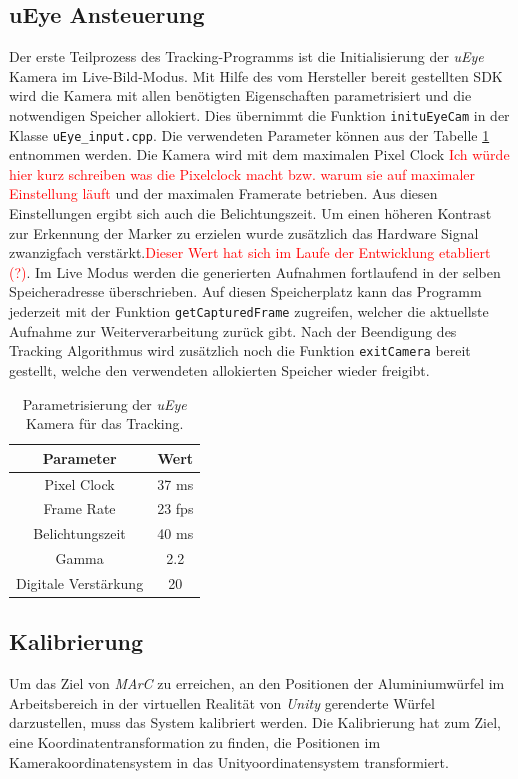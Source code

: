 \subsection{uEye Ansteuerung}
Der erste Teilprozess des Tracking-Programms ist die Initialisierung der \textit{uEye} Kamera im Live-Bild-Modus. Mit Hilfe des vom Hersteller bereit gestellten SDK wird die Kamera mit allen benötigten Eigenschaften parametrisiert und die notwendigen Speicher allokiert. Dies übernimmt die Funktion \texttt{inituEyeCam} in der Klasse \texttt{uEye\_input.cpp}. Die verwendeten Parameter können aus der Tabelle \ref{tab:UeyeParam} entnommen werden. Die Kamera wird mit dem maximalen Pixel Clock \textcolor{red}{Ich würde hier kurz schreiben was die Pixelclock macht bzw. warum sie auf maximaler Einstellung läuft} und der maximalen Framerate betrieben. Aus diesen Einstellungen ergibt sich auch die Belichtungszeit. Um einen höheren Kontrast zur Erkennung der Marker zu erzielen wurde zusätzlich das Hardware Signal zwanzigfach verstärkt.\textcolor{red}{Dieser Wert hat sich im Laufe der Entwicklung etabliert (?)}.
Im Live Modus werden die generierten Aufnahmen fortlaufend in der selben Speicheradresse überschrieben. Auf diesen Speicherplatz kann das Programm jederzeit mit der Funktion \texttt{getCapturedFrame} zugreifen, welcher die aktuellste Aufnahme zur Weiterverarbeitung zurück gibt. Nach der Beendigung des Tracking Algorithmus wird zusätzlich noch die Funktion \texttt{exitCamera} bereit gestellt, welche den verwendeten allokierten Speicher wieder freigibt.

\begin{table}
	\centering
	\begin{tabular}{|c|c|}
		\hline
		\Absatzbox{}
		\textbf{Parameter}& \textbf{Wert} \\
		\hline
		Pixel Clock & 37 ms \\
		\hline
		Frame Rate & 23 fps \\
		\hline 
		Belichtungszeit & 40 ms\\
		\hline
		Gamma & 2.2 \\
		\hline
		Digitale Verstärkung & 20 \\
		\hline
	\end{tabular}
	\caption{Parametrisierung der \textit{uEye} Kamera für das Tracking.}
	\label{tab:UeyeParam}
\end{table}

\subsection{Kalibrierung}\label{sec:calib}
Um das Ziel von \textit{MArC} zu erreichen, an den Positionen der Aluminiumwürfel im Arbeitsbereich in der virtuellen Realität von \textit{Unity} gerenderte Würfel darzustellen, muss das System kalibriert werden. Die Kalibrierung hat zum Ziel, eine Koordinatentransformation zu finden, die Positionen im Kamerakoordinatensystem in das Unityoordinatensystem transformiert.


